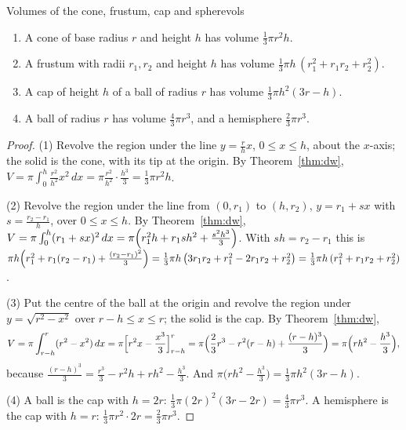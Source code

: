 \documentclass[11pt]{article}
\begin{document}
\begin{thm}{Volumes of the cone, frustum, cap and sphere}{vols}
\begin{enumerate}[label=(\arabic*),nosep]
  \item A cone of base radius $r$ and height $h$ has volume $\frac13\pi r^2h$.
  \item A frustum with radii $r_1,r_2$ and height $h$ has volume $\frac13\pi h\,(r_1^2+r_1r_2+r_2^2)$.
  \item A cap of height $h$ of a ball of radius $r$ has volume $\frac13\pi h^2(3r-h)$.
  \item A ball of radius $r$ has volume $\frac43\pi r^3$, and a hemisphere $\frac23\pi r^3$.
\end{enumerate}
\end{thm}
\begin{proof}
(1) Revolve the region under the line $y=\frac rhx$, $0\le x\le h$, about the $x$-axis; the solid is the cone, with its tip at the origin. By Theorem~\ref{thm:dw}, $V=\pi\int_0^h\frac{r^2}{h^2}x^2\,dx=\pi\frac{r^2}{h^2}\cdot\frac{h^3}3=\frac13\pi r^2h$.

(2) Revolve the region under the line from $(0,r_1)$ to $(h,r_2)$, $y=r_1+sx$ with $s=\frac{r_2-r_1}h$, over $0\le x\le h$. By Theorem~\ref{thm:dw}, $V=\pi\int_0^h(r_1+sx)^2\,dx=\pi\Bigl(r_1^2h+r_1sh^2+\frac{s^2h^3}3\Bigr)$. With $sh=r_2-r_1$ this is $\pi h\Bigl(r_1^2+r_1(r_2-r_1)+\frac{(r_2-r_1)^2}3\Bigr)=\frac13\pi h\,\bigl(3r_1r_2+r_1^2-2r_1r_2+r_2^2\bigr)=\frac13\pi h\,(r_1^2+r_1r_2+r_2^2)$.

(3) Put the centre of the ball at the origin and revolve the region under $y=\sqrt{r^2-x^2}$ over $r-h\le x\le r$; the solid is the cap. By Theorem~\ref{thm:dw},
\[
V=\pi\int_{r-h}^{r}(r^2-x^2)\,dx=\pi\Bigl[r^2x-\frac{x^3}3\Bigr]_{r-h}^r=\pi\Bigl(\frac23r^3-r^2(r-h)+\frac{(r-h)^3}3\Bigr)=\pi\Bigl(rh^2-\frac{h^3}3\Bigr),
\]
because $\frac{(r-h)^3}3=\frac{r^3}3-r^2h+rh^2-\frac{h^3}3$. And $\pi\bigl(rh^2-\frac{h^3}3\bigr)=\frac13\pi h^2(3r-h)$.

(4) A ball is the cap with $h=2r$: $\frac13\pi(2r)^2(3r-2r)=\frac43\pi r^3$. A hemisphere is the cap with $h=r$: $\frac13\pi r^2\cdot2r=\frac23\pi r^3$.
\end{proof}
\end{document}
